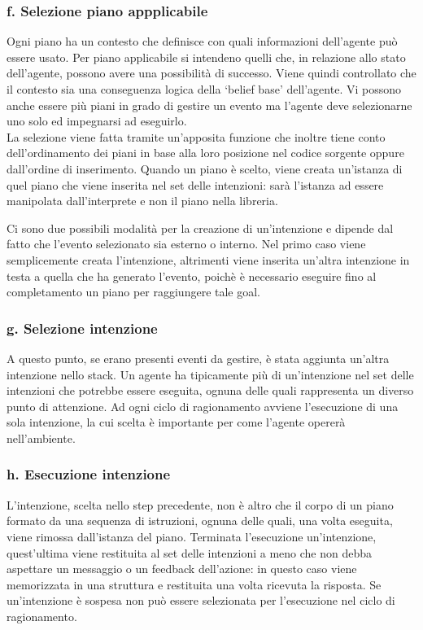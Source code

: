 \subsubsection{f. Selezione piano appplicabile}
Ogni piano ha un contesto che definisce con quali informazioni dell'agente pu\`o essere usato.
Per piano applicabile si intendeno quelli che, in relazione allo stato dell'agente, possono avere una possibilit\`a di successo. Viene quindi controllato che il contesto sia una conseguenza logica della `belief base' dell'agente. Vi possono anche essere pi\`u piani in grado di gestire un evento ma l'agente deve selezionarne uno solo ed impegnarsi ad eseguirlo.
\\La selezione viene fatta tramite un'apposita funzione che inoltre tiene conto dell'ordinamento dei piani in base alla loro posizione nel codice sorgente oppure dall'ordine di inserimento. Quando un piano \`e scelto, viene creata un'istanza di quel piano che viene inserita nel set delle intenzioni: sar\`a l'istanza ad essere manipolata dall'interprete e non il piano nella libreria.

Ci sono due possibili modalit\`a per la creazione di un'intenzione e dipende dal fatto che l'evento selezionato sia esterno o interno. Nel primo caso viene semplicemente creata l'intenzione, altrimenti viene inserita un'altra intenzione in testa a quella che ha generato l'evento, poich\`e \`e necessario eseguire fino al completamento un piano per raggiungere tale goal.

\subsubsection{g. Selezione intenzione}
A questo punto, se erano presenti eventi da gestire, \`e stata aggiunta un'altra intenzione nello stack. Un agente ha tipicamente pi\`u di un'intenzione nel set delle intenzioni che potrebbe essere eseguita, ognuna delle quali rappresenta un diverso punto di attenzione. Ad ogni ciclo di ragionamento avviene l'esecuzione di una sola intenzione, la cui scelta \`e importante per come l'agente operer\`a nell'ambiente.

\subsubsection{h. Esecuzione intenzione}
L'intenzione, scelta nello step precedente, non \`e altro che il corpo di un piano formato da una sequenza di istruzioni, ognuna delle quali, una volta eseguita, viene rimossa dall'istanza del piano. Terminata l'esecuzione un'intenzione, quest'ultima viene restituita al set delle intenzioni a meno che non debba aspettare un messaggio o un feedback dell'azione: in questo caso viene memorizzata in una struttura e restituita una volta ricevuta la risposta.
Se un'intenzione \`e sospesa non pu\`o essere selezionata per l'esecuzione nel ciclo di ragionamento.

